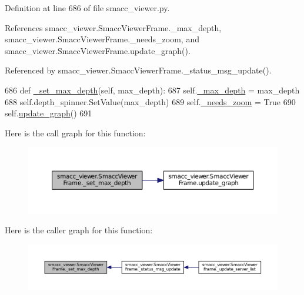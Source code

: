 Definition at line 686 of file smacc\+\_\+viewer.\+py.



References smacc\+\_\+viewer.\+Smacc\+Viewer\+Frame.\+\_\+max\+\_\+depth, smacc\+\_\+viewer.\+Smacc\+Viewer\+Frame.\+\_\+needs\+\_\+zoom, and smacc\+\_\+viewer.\+Smacc\+Viewer\+Frame.\+update\+\_\+graph().



Referenced by smacc\+\_\+viewer.\+Smacc\+Viewer\+Frame.\+\_\+status\+\_\+msg\+\_\+update().


\begin{DoxyCode}
686     \textcolor{keyword}{def }\hyperlink{classsmacc__viewer_1_1SmaccViewerFrame_a86f358ee6df80b185f70292675070a8d}{\_set\_max\_depth}(self, max\_depth):
687         self.\hyperlink{classsmacc__viewer_1_1SmaccViewerFrame_acf8a98a2a2d4ae1f21e0fc3cd020b89a}{\_max\_depth} = max\_depth
688         self.depth\_spinner.SetValue(max\_depth)
689         self.\hyperlink{classsmacc__viewer_1_1SmaccViewerFrame_a2307d88cbcee116cf8a6fa2201aedc44}{\_needs\_zoom} = \textcolor{keyword}{True}
690         self.\hyperlink{classsmacc__viewer_1_1SmaccViewerFrame_a3dbf56a66153e99b403fe731ea8a6759}{update\_graph}()
691 
\end{DoxyCode}


Here is the call graph for this function\+:
\nopagebreak
\begin{figure}[H]
\begin{center}
\leavevmode
\includegraphics[width=350pt]{classsmacc__viewer_1_1SmaccViewerFrame_a86f358ee6df80b185f70292675070a8d_cgraph}
\end{center}
\end{figure}




Here is the caller graph for this function\+:
\nopagebreak
\begin{figure}[H]
\begin{center}
\leavevmode
\includegraphics[width=350pt]{classsmacc__viewer_1_1SmaccViewerFrame_a86f358ee6df80b185f70292675070a8d_icgraph}
\end{center}
\end{figure}


